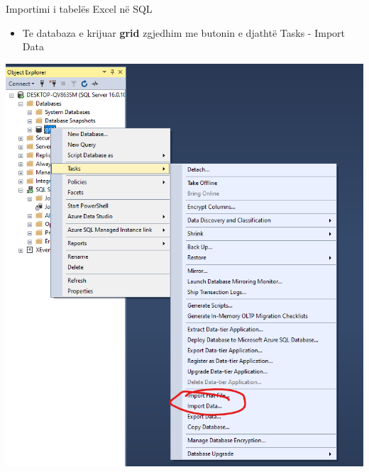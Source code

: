 \documentclass[
  ignorenonframetext,
]{beamer}
\providecommand{\tightlist}{%
  \setlength{\itemsep}{0pt}\setlength{\parskip}{0pt}}
\begin{document}
\begin{frame}{Importimi i tabelës Excel në SQL}
\label{importimi-i-tabeluxebs-excel-nuxeb-sql-3}
\begin{itemize}
\tightlist
\item
  Te databaza e krijuar \textbf{grid} zgjedhim me butonin e djathtë
  Tasks - Import Data
\end{itemize}

\includegraphics{./Figs/db4.png}
\end{frame}
\end{document}
